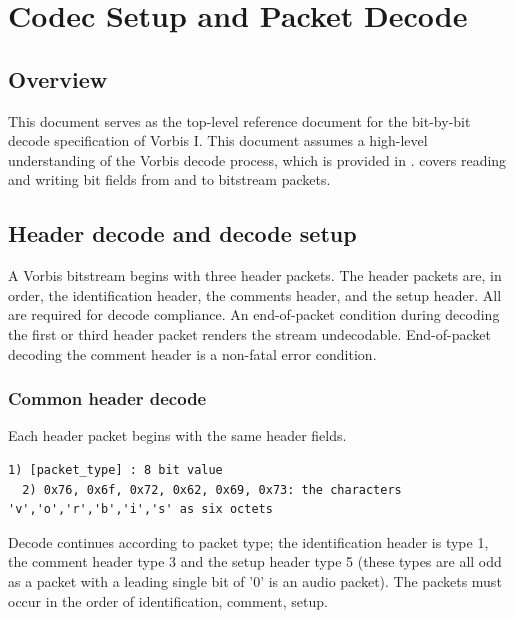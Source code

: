 
\section{Codec Setup and Packet Decode} \label{vorbis:spec:codec}

\subsection{Overview}

This document serves as the top-level reference document for the
bit-by-bit decode specification of Vorbis I.  This document assumes a
high-level understanding of the Vorbis decode process, which is
provided in .   covers reading and writing bit fields from
and to bitstream packets.



\subsection{Header decode and decode setup}

A Vorbis bitstream begins with three header packets. The header
packets are, in order, the identification header, the comments header,
and the setup header. All are required for decode compliance.  An
end-of-packet condition during decoding the first or third header
packet renders the stream undecodable.  End-of-packet decoding the
comment header is a non-fatal error condition.

\subsubsection{Common header decode}

Each header packet begins with the same header fields.


\begin{Verbatim}[commandchars=\\\{\}]
  1) [packet_type] : 8 bit value
  2) 0x76, 0x6f, 0x72, 0x62, 0x69, 0x73: the characters 'v','o','r','b','i','s' as six octets
\end{Verbatim}

Decode continues according to packet type; the identification header
is type 1, the comment header type 3 and the setup header type 5
(these types are all odd as a packet with a leading single bit of '0'
is an audio packet).  The packets must occur in the order of
identification, comment, setup.



